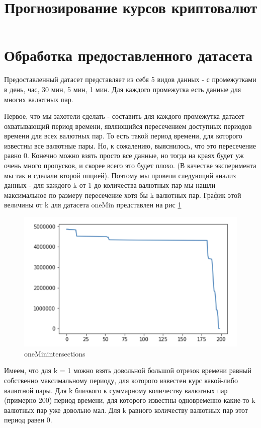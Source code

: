 \documentclass[11pt]{article}
\title{\textbf{Прогнозирование курсов криптовалют}}
\begin{document}
\maketitle

\section{Обработка предоставленного датасета}
Предоставленный датасет представляет из себя 5 видов данных - с промежутками в день, час, 30 мин, 5 мин, 1 мин. Для каждого промежутка есть данные для многих валютных пар. 

Первое, что мы захотели сделать - составить для каждого промежутка датасет охватывающий период времени, являющийся пересечением доступных периодов времени для всех валютных пар. То есть такой период времени, для которого известны все валютные пары. Но, к сожалению, выяснилось, что это пересечение равно 0. Конечно можно взять просто все данные, но тогда на краях будет уж очень много пропусков, и скорее всего это будет плохо. (В качестве эксперимента мы так и сделали второй опцией). Поэтому мы провели следующий анализ данных - для каждого k от 1 до количества валютных пар мы нашли максимальное по размеру пересечение хотя бы k валютных пар. График этой величины от k для датасета oneMin представлен на рис \ref{fig:oneMin_intersections}
\begin{figure}[!htb]
\includegraphics[width = 15cm]{oneMin_intersections.png}
\caption{oneMinintersections}
\label{fig:oneMin_intersections}
\end{figure}

Имеем, что для k = 1 можно взять довольной большой отрезок времени равный собственно максимальному периоду, для которого известен курс какой-либо валютной пары. Для k близкого к суммарному количеству валютных пар (примерно  200) период времени, для которого известны одновременно какие-то k валютных пар уже довольно мал. Для k равного количеству валютных пар этот период равен 0. 
\end{document}
